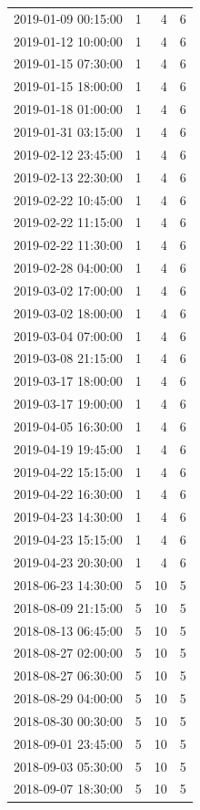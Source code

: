 \begin{tabular}{lrrr}
2019-01-09 00:15:00 & 1 & 4 & 6 \\
2019-01-12 10:00:00 & 1 & 4 & 6 \\
2019-01-15 07:30:00 & 1 & 4 & 6 \\
2019-01-15 18:00:00 & 1 & 4 & 6 \\
2019-01-18 01:00:00 & 1 & 4 & 6 \\
2019-01-31 03:15:00 & 1 & 4 & 6 \\
2019-02-12 23:45:00 & 1 & 4 & 6 \\
2019-02-13 22:30:00 & 1 & 4 & 6 \\
2019-02-22 10:45:00 & 1 & 4 & 6 \\
2019-02-22 11:15:00 & 1 & 4 & 6 \\
2019-02-22 11:30:00 & 1 & 4 & 6 \\
2019-02-28 04:00:00 & 1 & 4 & 6 \\
2019-03-02 17:00:00 & 1 & 4 & 6 \\
2019-03-02 18:00:00 & 1 & 4 & 6 \\
2019-03-04 07:00:00 & 1 & 4 & 6 \\
2019-03-08 21:15:00 & 1 & 4 & 6 \\
2019-03-17 18:00:00 & 1 & 4 & 6 \\
2019-03-17 19:00:00 & 1 & 4 & 6 \\
2019-04-05 16:30:00 & 1 & 4 & 6 \\
2019-04-19 19:45:00 & 1 & 4 & 6 \\
2019-04-22 15:15:00 & 1 & 4 & 6 \\
2019-04-22 16:30:00 & 1 & 4 & 6 \\
2019-04-23 14:30:00 & 1 & 4 & 6 \\
2019-04-23 15:15:00 & 1 & 4 & 6 \\
2019-04-23 20:30:00 & 1 & 4 & 6 \\
2018-06-23 14:30:00 & 5 & 10 & 5 \\
2018-08-09 21:15:00 & 5 & 10 & 5 \\
2018-08-13 06:45:00 & 5 & 10 & 5 \\
2018-08-27 02:00:00 & 5 & 10 & 5 \\
2018-08-27 06:30:00 & 5 & 10 & 5 \\
2018-08-29 04:00:00 & 5 & 10 & 5 \\
2018-08-30 00:30:00 & 5 & 10 & 5 \\
2018-09-01 23:45:00 & 5 & 10 & 5 \\
2018-09-03 05:30:00 & 5 & 10 & 5 \\
2018-09-07 18:30:00 & 5 & 10 & 5 \\

\end{tabular}
